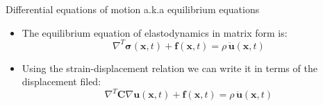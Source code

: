 \documentclass[aspectratio=169]{beamer}
\begin{document}
{{
\begin{frame}{Differential equations of motion a.k.a equilibrium equations}
  \begin{block}{}
    \begin{itemize}
      \item The equilibrium equation of elastodynamics in matrix form is:
            $$\nabla^T\boldsymbol\sigma(\mathbf x,t)+\mathbf f(\mathbf x,t)=\rho\, \mathbf{\ddot{u}}(\mathbf x,t)$$
      \item Using the strain-displacement relation we can write it in terms of the displacement filed:
            $$\nabla^T\mathbf C\nabla\mathbf u(\mathbf x,t)+\mathbf f(\mathbf x,t)=\rho\, \mathbf{\ddot{u}}(\mathbf x,t)$$
    \end{itemize}
  \end{block}
\end{frame}
}

}
\end{document}
